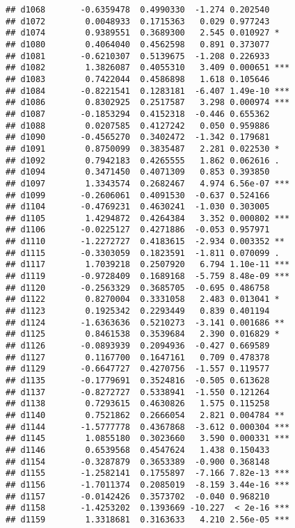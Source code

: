 \documentclass[
]{article}
\begin{document}
\begin{verbatim}
## d1068       -0.6359478  0.4990330  -1.274 0.202540    
## d1072        0.0048933  0.1715363   0.029 0.977243    
## d1074        0.9389551  0.3689300   2.545 0.010927 *  
## d1080        0.4064040  0.4562598   0.891 0.373077    
## d1081       -0.6210307  0.5139675  -1.208 0.226933    
## d1082        1.3826087  0.4055310   3.409 0.000651 ***
## d1083        0.7422044  0.4586898   1.618 0.105646    
## d1084       -0.8221541  0.1283181  -6.407 1.49e-10 ***
## d1086        0.8302925  0.2517587   3.298 0.000974 ***
## d1087       -0.1853294  0.4152318  -0.446 0.655362    
## d1088        0.0207585  0.4127242   0.050 0.959886    
## d1090       -0.4565270  0.3402472  -1.342 0.179681    
## d1091        0.8750099  0.3835487   2.281 0.022530 *  
## d1092        0.7942183  0.4265555   1.862 0.062616 .  
## d1094        0.3471450  0.4071309   0.853 0.393850    
## d1097        1.3343574  0.2682467   4.974 6.56e-07 ***
## d1099       -0.2606061  0.4091530  -0.637 0.524166    
## d1104       -0.4769231  0.4630241  -1.030 0.303005    
## d1105        1.4294872  0.4264384   3.352 0.000802 ***
## d1106       -0.0225127  0.4271886  -0.053 0.957971    
## d1110       -1.2272727  0.4183615  -2.934 0.003352 ** 
## d1115       -0.3303059  0.1823591  -1.811 0.070099 .  
## d1117        1.7039218  0.2507920   6.794 1.10e-11 ***
## d1119       -0.9728409  0.1689168  -5.759 8.48e-09 ***
## d1120       -0.2563329  0.3685705  -0.695 0.486758    
## d1122        0.8270004  0.3331058   2.483 0.013041 *  
## d1123        0.1925342  0.2293449   0.839 0.401194    
## d1124       -1.6363636  0.5210273  -3.141 0.001686 ** 
## d1125        0.8461538  0.3539684   2.390 0.016829 *  
## d1126       -0.0893939  0.2094936  -0.427 0.669589    
## d1127        0.1167700  0.1647161   0.709 0.478378    
## d1129       -0.6647727  0.4270756  -1.557 0.119577    
## d1135       -0.1779691  0.3524816  -0.505 0.613628    
## d1137       -0.8272727  0.5338941  -1.550 0.121264    
## d1138        0.7293615  0.4630826   1.575 0.115258    
## d1140        0.7521862  0.2666054   2.821 0.004784 ** 
## d1144       -1.5777778  0.4367868  -3.612 0.000304 ***
## d1145        1.0855180  0.3023660   3.590 0.000331 ***
## d1146        0.6539568  0.4547624   1.438 0.150433    
## d1154       -0.3287879  0.3653389  -0.900 0.368148    
## d1155       -1.2582141  0.1755897  -7.166 7.82e-13 ***
## d1156       -1.7011374  0.2085019  -8.159 3.44e-16 ***
## d1157       -0.0142426  0.3573702  -0.040 0.968210    
## d1158       -1.4253202  0.1393669 -10.227  < 2e-16 ***
## d1159        1.3318681  0.3163633   4.210 2.56e-05 ***

\end{verbatim}
\end{document}
